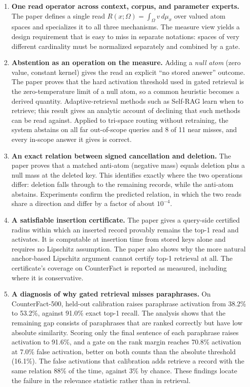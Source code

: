 \documentclass[11pt]{article}
\begin{document}
\begin{enumerate}[leftmargin=*]
\item \textbf{One read operator across context, corpus, and parameter experts.} The paper defines a single read $R(x;\Omega)=\int_\Omega v\,d\mu_x$ over valued atom spaces and specializes it to all three mechanisms. The measure view yields a design requirement that is easy to miss in separate notations: spaces of very different cardinality must be normalized separately and combined by a gate.

\item \textbf{Abstention as an operation on the measure.} Adding a \emph{null atom} (zero value, constant kernel) gives the read an explicit ``no stored answer'' outcome. The paper proves that the hard activation threshold used in gated retrieval is the zero-temperature limit of a null atom, so a common heuristic becomes a derived quantity. Adaptive-retrieval methods such as Self-RAG learn when to retrieve; this result gives an analytic account of declining that such methods can be read against. Applied to tri-space routing without retraining, the system abstains on all far out-of-scope queries and 8 of 11 near misses, and every in-scope answer it gives is correct.

\item \textbf{An exact relation between signed cancellation and deletion.} The paper proves that a matched anti-atom (negative mass) equals deletion plus a null mass at the deleted key. This identifies exactly where the two operations differ: deletion falls through to the remaining records, while the anti-atom abstains. Experiments confirm the predicted relation, in which the two reads share a direction and differ by a factor of about $10^{-4}$.

\item \textbf{A satisfiable insertion certificate.} The paper gives a query-side certified radius within which an inserted record provably remains the top-1 read and activates. It is computable at insertion time from stored keys alone and requires no Lipschitz assumption. The paper also shows why the more natural anchor-based Lipschitz argument cannot certify top-1 retrieval at all. The certificate's coverage on CounterFact is reported as measured, including where it is conservative.

\item \textbf{A diagnosis of why gated retrieval misses paraphrases.} On CounterFact-500, held-out calibration raises paraphrase activation from 38.2\% to 53.2\%, against 91.0\% exact top-1 recall. The analysis shows that the remaining gap consists of paraphrases that are ranked correctly but have low absolute similarity. Scoring only the final sentence of each paraphrase raises activation to 91.6\%, and a gate on the rank margin reaches 70.8\% activation at 7.0\% false activation, better on both counts than the absolute threshold (16.1\%). The false activations that calibration adds retrieve a record with the same relation 88\% of the time, against 3\% by chance. These findings locate the failure in the relevance statistic rather than in retrieval.


\end{enumerate}
\end{document}
